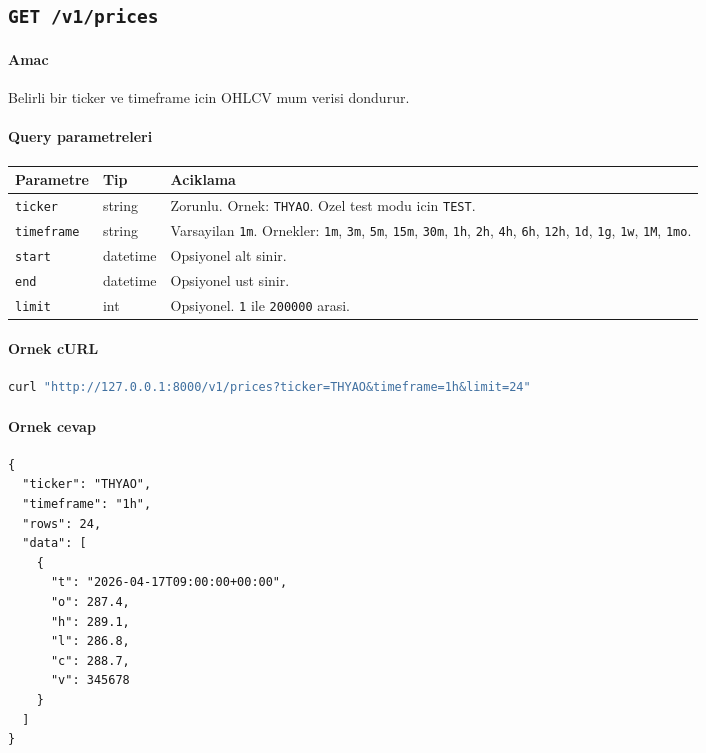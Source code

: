 \documentclass[11pt,a4paper]{article}
\begin{document}
\subsection{\texttt{GET /v1/prices}}

\paragraph{Amac}
Belirli bir ticker ve timeframe icin OHLCV mum verisi dondurur.

\paragraph{Query parametreleri}
\begin{longtable}{>{\raggedright\arraybackslash}p{3cm} >{\raggedright\arraybackslash}p{2.2cm} >{\raggedright\arraybackslash}p{8.2cm}}
\toprule
Parametre & Tip & Aciklama \\
\midrule
\endhead
\texttt{ticker} & string & Zorunlu. Ornek: \texttt{THYAO}. Ozel test modu icin \texttt{TEST}. \\
\texttt{timeframe} & string & Varsayilan \texttt{1m}. Ornekler: \texttt{1m}, \texttt{3m}, \texttt{5m}, \texttt{15m}, \texttt{30m}, \texttt{1h}, \texttt{2h}, \texttt{4h}, \texttt{6h}, \texttt{12h}, \texttt{1d}, \texttt{1g}, \texttt{1w}, \texttt{1M}, \texttt{1mo}. \\
\texttt{start} & datetime & Opsiyonel alt sinir. \\
\texttt{end} & datetime & Opsiyonel ust sinir. \\
\texttt{limit} & int & Opsiyonel. \texttt{1} ile \texttt{200000} arasi. \\
\bottomrule
\end{longtable}

\paragraph{Ornek cURL}
\begin{lstlisting}[language=bash]
curl "http://127.0.0.1:8000/v1/prices?ticker=THYAO&timeframe=1h&limit=24"
\end{lstlisting}

\paragraph{Ornek cevap}
\begin{lstlisting}
{
  "ticker": "THYAO",
  "timeframe": "1h",
  "rows": 24,
  "data": [
    {
      "t": "2026-04-17T09:00:00+00:00",
      "o": 287.4,
      "h": 289.1,
      "l": 286.8,
      "c": 288.7,
      "v": 345678
    }
  ]
}
\end{lstlisting}
\end{document}
